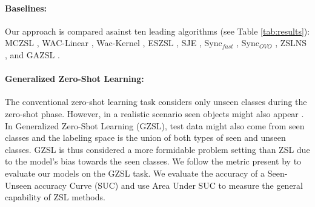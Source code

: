 \documentclass[11pt,a4paper]{article}
\begin{document}
\paragraph{Baselines:} 
Our approach is compared asainst ten leading algorithms (see Table \ref{tab:results}): MCZSL \citep{akata2016multi}, WAC-Linear \citep{elhoseiny2013write}, Wac-Kernel  \citep{elhoseiny2016write}, ESZSL   \citep{romera2015embarrassingly}, SJE  \citep{akata2015evaluation}, Sync$_{fast}$ \citep{changpinyo2016synthesized}, Sync$_{OVO}$ \citep{changpinyo2016synthesized},
ZSLNS \citep{qiao2016less}, and GAZSL \citep{zhu2018generative}. 


\paragraph{Generalized Zero-Shot Learning:} 
The conventional zero-shot learning task considers only unseen classes during the zero-shot phase. However, in a realistic scenario seen objects might also appear \cite{chao2016empirical}. In Generalized Zero-Shot Learning (GZSL), test data might also come from seen classes and the labeling space is the union of both types of seen and unseen classes. GZSL is thus considered a more formidable problem setting
than ZSL due to the model's bias towards the seen classes.
We follow the metric present by \citet{chao2016empirical} to evaluate our models on the GZSL task. We evaluate the accuracy of a Seen-Unseen accuracy Curve (SUC) and use Area Under SUC to measure the general capability of ZSL methods.
\end{document}
